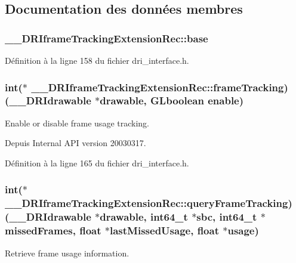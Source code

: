 \subsection{Documentation des données membres}
\hypertarget{struct_____d_r_iframe_tracking_extension_rec_af01dbdf8b0011437192aed241ef2b420}{
\subsubsection[{base}]{ \-\_\-\-\_\-\-D\-R\-Iframe\-Tracking\-Extension\-Rec\-::base}}\label{struct_____d_r_iframe_tracking_extension_rec_af01dbdf8b0011437192aed241ef2b420}


Définition à la ligne 158 du fichier dri\-\_\-interface.\-h.

\hypertarget{struct_____d_r_iframe_tracking_extension_rec_a013f6afc10103f82b9e975f37cfc7a45}{
\subsubsection[{frame\-Tracking}]{\setlength{\rightskip}{0pt plus 5cm}int($\ast$ \-\_\-\-\_\-\-D\-R\-Iframe\-Tracking\-Extension\-Rec\-::frame\-Tracking)({\bf \-\_\-\-\_\-\-D\-R\-Idrawable} $\ast$drawable, {\bf G\-Lboolean} {\bf enable})}}\label{struct_____d_r_iframe_tracking_extension_rec_a013f6afc10103f82b9e975f37cfc7a45}
Enable or disable frame usage tracking.

\begin{DoxySince}{Depuis}
Internal A\-P\-I version 20030317. 
\end{DoxySince}


Définition à la ligne 165 du fichier dri\-\_\-interface.\-h.

\hypertarget{struct_____d_r_iframe_tracking_extension_rec_a9d980a0990814cad8ceae79fc75b4094}{
\subsubsection[{query\-Frame\-Tracking}]{\setlength{\rightskip}{0pt plus 5cm}int($\ast$ \-\_\-\-\_\-\-D\-R\-Iframe\-Tracking\-Extension\-Rec\-::query\-Frame\-Tracking)({\bf \-\_\-\-\_\-\-D\-R\-Idrawable} $\ast$drawable, int64\-\_\-t $\ast$sbc, int64\-\_\-t $\ast$missed\-Frames, float $\ast$last\-Missed\-Usage, float $\ast${\bf usage})}}\label{struct_____d_r_iframe_tracking_extension_rec_a9d980a0990814cad8ceae79fc75b4094}
Retrieve frame usage information.

